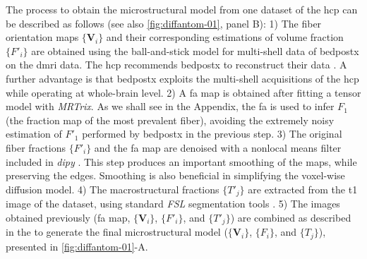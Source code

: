 \documentclass[english]{frontiers/frontiersSCNS} %
\begin{document}
The process to obtain the microstructural model from one dataset of the \gls*{hcp} can be described
  as follows (see also \autoref{fig:diffantom-01}, panel B):
1) The fiber orientation maps $\{\mathbf{V}_i\}$ and their corresponding estimations of volume fraction $\{F'_i\}$ are
  obtained using the ball-and-stick model for multi-shell data of \gls*{bedpostx}
  on the \gls*{dmri} data.
The \gls*{hcp} recommends \gls*{bedpostx} to reconstruct their data \citep{glasser_minimal_2013}.
A further advantage is that \gls*{bedpostx} exploits the multi-shell acquisitions of the \gls*{hcp} while
  operating at whole-brain level.
2) A \gls*{fa} map is obtained after fitting a tensor model with \emph{MRTrix}.
As we shall see in the Appendix, the \gls*{fa} is used to infer $F_1$ (the fraction map of the most prevalent fiber),
  avoiding the extremely noisy estimation of $F'_1$ performed by \gls*{bedpostx} in the previous step.
3) The original fiber fractions $\{F'_i\}$ and the \gls*{fa} map are denoised with a nonlocal means filter included
  in \emph{dipy} \citep{garyfallidis_dipy_2014}.
This step produces an important smoothing of the maps, while preserving the edges.
Smoothing is also beneficial in simplifying the voxel-wise diffusion model.
4) The macrostructural fractions $\{T'_j\}$ are extracted from the \acrlong*{t1} image of the dataset,
  using standard \emph{FSL} segmentation tools \citep{jenkinson_fsl_2012}.
5) The images obtained previously (\gls*{fa} map, $\{\mathbf{V}_i\}$, $\{F'_i\}$, and $\{T'_j\}$)
  are combined as described in the  to generate the final microstructural model
  ($\{\mathbf{V}_i\}$, $\{F_i\}$, and $\{T_j\}$), presented in \autoref{fig:diffantom-01}-A.
\end{document}
